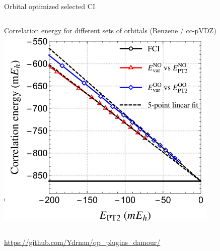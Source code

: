 \documentclass[aspectratio=169,9pt]{beamer}
\begin{document}
\begin{frame}{Orbital optimized selected CI}
\begin{columns}
                \begin{column}{0.5\textwidth}
                        \centering
            \begin{block}{Correlation energy for different sets of orbitals (Benzene / cc-pVDZ) }
                        \centering
                        \includegraphics[width=0.8\textwidth]{fig/extrapolation.png}
                        \end{block}
                \end{column}

        \end{columns}

                        \bigskip
                        \centering
    \url{https://github.com/Ydrnan/qp_plugins_damour/}

\end{frame}

\end{document}
